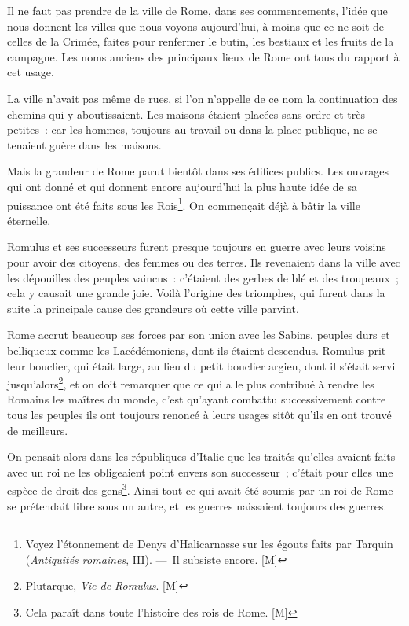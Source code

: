 \documentclass[french,twoside]{book} %
\newcommand\chaptercont{} %
\begin{document}
\chaptercont
\noindent Il ne faut pas prendre de la ville de Rome, dans ses commencements, l’idée que nous donnent les villes que nous voyons aujourd’hui, à moins que ce ne soit de celles de la Crimée, faites pour renfermer le butin, les bestiaux et les fruits de la campagne. Les noms anciens des principaux lieux de Rome ont tous du rapport à cet usage.\par
La ville n’avait pas même de rues, si l’on n’appelle de ce nom la continuation des chemins qui y aboutissaient. Les maisons étaient placées sans ordre et très petites : car les hommes, toujours au travail ou dans la place publique, ne se tenaient guère dans les maisons.\par
Mais la grandeur de Rome parut bientôt dans ses édifices publics. Les ouvrages qui ont donné et qui donnent encore aujourd’hui la plus haute idée de sa puissance ont été faits sous les Rois\footnote{Voyez l’étonnement de Denys d’Halicarnasse sur les égouts faits par Tarquin ({\itshape Antiquités romaines}, III). — Il subsiste encore. [M]}. On commençait déjà à bâtir la ville éternelle.\par
Romulus et ses successeurs furent presque toujours en guerre avec leurs voisins pour avoir des citoyens, des femmes ou des terres. Ils revenaient dans la ville avec les dépouilles des peuples vaincus : c’étaient des gerbes de blé et des troupeaux ; cela y causait une grande joie. Voilà l’origine des triomphes, qui furent dans la suite la principale cause des grandeurs où cette ville parvint.\par
Rome accrut beaucoup ses forces par son union avec les Sabins, peuples durs et belliqueux comme les Lacédémoniens, dont ils étaient descendus. Romulus prit leur bouclier, qui était large, au lieu du petit bouclier argien, dont il s’était servi jusqu’alors\footnote{Plutarque, {\itshape Vie de Romulus}. [M]}, et on doit remarquer que ce qui a le plus contribué à rendre les Romains les maîtres du monde, c’est qu’ayant combattu successivement contre tous les peuples ils ont toujours renoncé à leurs usages sitôt qu’ils en ont trouvé de meilleurs.\par
On pensait alors dans les républiques d’Italie que les traités qu’elles avaient faits avec un roi ne les obligeaient point envers son successeur ; c’était pour elles une espèce de droit des gens\footnote{Cela paraît dans toute l’histoire des rois de Rome. [M]}. Ainsi tout ce qui avait été soumis par un roi de Rome se prétendait libre sous un autre, et les guerres naissaient toujours des guerres.\par
\end{document}
